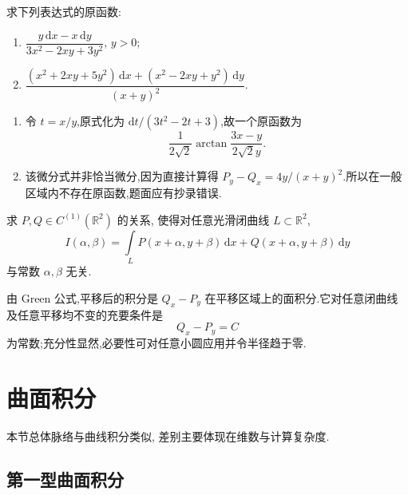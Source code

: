 \begin{example}
    求下列表达式的原函数:
    \begin{enumerate}
        \item $\displaystyle\dfrac{y\,\mathrm{d}x-x\,\mathrm{d}y}{3x^2-2xy+3y^2}$, $y>0$;
        \item $\displaystyle\dfrac{(x^2+2xy+5y^2)\,\mathrm{d}x+(x^2-2xy+y^2)\,\mathrm{d}y}{(x+y)^2}$.
    \end{enumerate}
\end{example}
\exampleblank

\begin{solution}
    \begin{enumerate}
        \item 令 $t=x/y$,原式化为 $\mathrm{d}t/(3t^2-2t+3)$,故一个原函数为
              \[
                  \dfrac{1}{2\sqrt{2}}\arctan\dfrac{3x-y}{2\sqrt{2}y}.
              \]
        \item 该微分式并非恰当微分,因为直接计算得 $P_y-Q_x=4y/(x+y)^2$.所以在一般区域内不存在原函数,题面应有抄录错误.
    \end{enumerate}
\end{solution}

\begin{example}
    求 $P,Q\in C^{(1)}(\mathbb{R}^2)$ 的关系, 使得对任意光滑闭曲线 $L\subset\mathbb{R}^2$,
    \[
        I(\alpha,\beta)=\int\limits_LP(x+\alpha,y+\beta)\,\mathrm{d}x+Q(x+\alpha,y+\beta)\,\mathrm{d}y
    \]
    与常数 $\alpha,\beta$ 无关.
\end{example}
\exampleblank

\begin{solution}
    由 Green 公式,平移后的积分是 $Q_x-P_y$ 在平移区域上的面积分.它对任意闭曲线及任意平移均不变的充要条件是
    \[
        Q_x-P_y=C
    \]
    为常数;充分性显然,必要性可对任意小圆应用并令半径趋于零.
\end{solution}


\newpage

\section{曲面积分}

本节总体脉络与曲线积分类似, 差别主要体现在维数与计算复杂度.



\subsection{第一型曲面积分}


